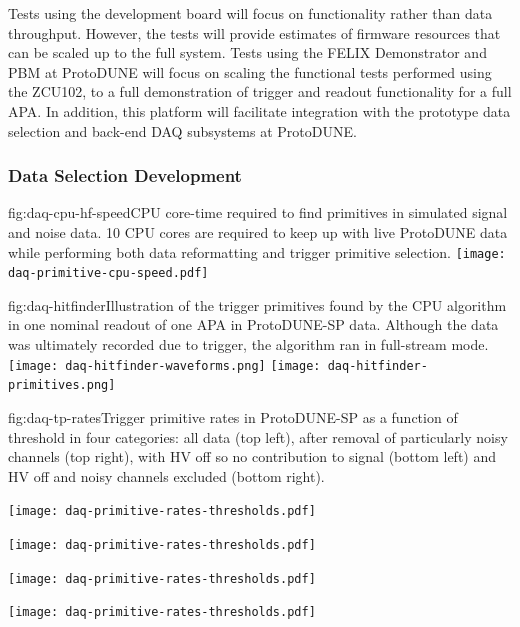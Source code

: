 Tests using the development board will focus on functionality
rather than data throughput. However, the tests will provide estimates
of firmware resources that can be scaled up to the full system. Tests
using the FELIX Demonstrator and PBM at ProtoDUNE will focus on
scaling the functional tests performed using the ZCU102, to a full
demonstration of trigger and readout functionality for a full APA. In
addition, this platform will facilitate integration with the prototype
data selection and back-end DAQ subsystems
at ProtoDUNE. 


\subsubsection{Data Selection Development}

\begin{dunefigure}{fig:daq-cpu-hf-speed}{CPU core-time required to find primitives in simulated signal and noise data.  10 CPU cores are required to keep up with live ProtoDUNE data while performing both data reformatting and trigger primitive selection.}
  \texttt{[image: daq-primitive-cpu-speed.pdf]}
\end{dunefigure}

\begin{dunefigure}{fig:daq-hitfinder}{Illustration of the trigger primitives found by the CPU algorithm in one nominal readout of one APA in ProtoDUNE-SP data.  Although the data was ultimately recorded due to trigger, the algorithm ran in full-stream mode.}
    \texttt{[image: daq-hitfinder-waveforms.png]}%
    \texttt{[image: daq-hitfinder-primitives.png]}
\end{dunefigure}

\begin{dunefigure}{fig:daq-tp-rates}{Trigger primitive rates in ProtoDUNE-SP as a function of threshold in four categories: all data (top left),  after removal of particularly noisy channels (top right), with HV off so no contribution to signal (bottom left) and HV off and noisy channels excluded (bottom right).}
  \begin{minipage}[b]{0.5\linewidth}
    \begin{center}
      \texttt{[image: daq-primitive-rates-thresholds.pdf]}

      \texttt{[image: daq-primitive-rates-thresholds.pdf]}
    \end{center}
  \end{minipage}%
  \begin{minipage}[b]{0.5\linewidth}
    \begin{center}
      \texttt{[image: daq-primitive-rates-thresholds.pdf]}

      \texttt{[image: daq-primitive-rates-thresholds.pdf]}
    \end{center}
  \end{minipage}

\end{dunefigure}


